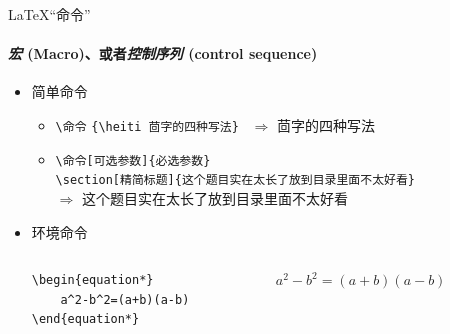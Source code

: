 \begin{frame}[fragile]{\LaTeX“命令”}
    \framesubtitle{\emph{宏} (Macro)、或者\emph{控制序列} (control sequence)}
    \begin{itemize}
        \item 简单命令
            \begin{itemize}
                \item \verb|\命令|\hspace{2em}
                    \verb|{\heiti 茴字的四种写法}| ~$\Rightarrow$ {\heiti 茴字的四种写法}
                \item \verb|\命令[可选参数]{必选参数}|\\
                    \verb|\section[精简标题]{这个题目实在太长了放到目录里面不太好看}|\\
                    $\Rightarrow$ { \hspace{1em} \songti 这个题目实在太长了放到目录里面不太好看}
            \end{itemize}
        \item 环境命令
            \begin{columns}[c]
                \begin{column}{0.45\textwidth}
                    \begin{lstlisting}[basicstyle=\ttfamily]
\begin{equation*}
    a^2-b^2=(a+b)(a-b)
\end{equation*}\end{lstlisting}
                \end{column}
                \hspace{1em}
                \begin{column}{0.45\textwidth}
                    $ a^2-b^2=(a+b)(a-b)$
                \end{column}
            \end{columns}
    \end{itemize}
\end{frame}

